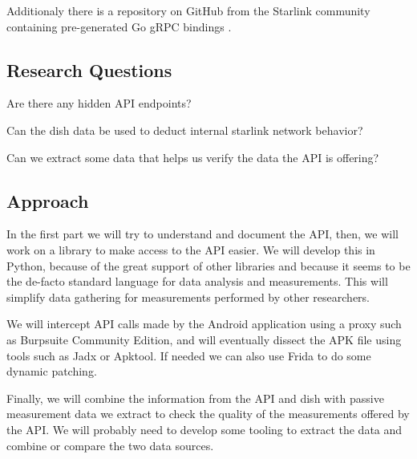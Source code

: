 \documentclass[NET,a4paper,12pt,english]{netforms}
\begin{document}
Additionaly there is a repository on GitHub from the Starlink community containing pre-generated Go gRPC bindings \cite{starlink-grpc-go}.

\subsection*{Research Questions}
\begin{researchquestions}
\item Are there any hidden API endpoints?
\item Can the dish data be used to deduct internal starlink network behavior?
\item Can we extract some data that helps us verify the data the API is offering?
\end{researchquestions}

\subsection*{Approach}
In the first part we will try to understand and document the API, then, we will work on a library to make access to the API easier.
We will develop this in Python, because of the great support of other libraries and because it seems to be the de-facto standard language
for data analysis and measurements. This will simplify data gathering for measurements performed by other researchers.

We will intercept API calls made by the Android application using a proxy such as Burpsuite Community Edition, and will eventually dissect the APK file
using tools such as Jadx or Apktool. If needed we can also use Frida to do some dynamic patching.

Finally, we will combine the information from the API and dish with passive measurement data we extract to check the quality of the measurements offered by the API.
We will probably need to develop some tooling to extract the data and combine or compare the two data sources.
\end{document}
